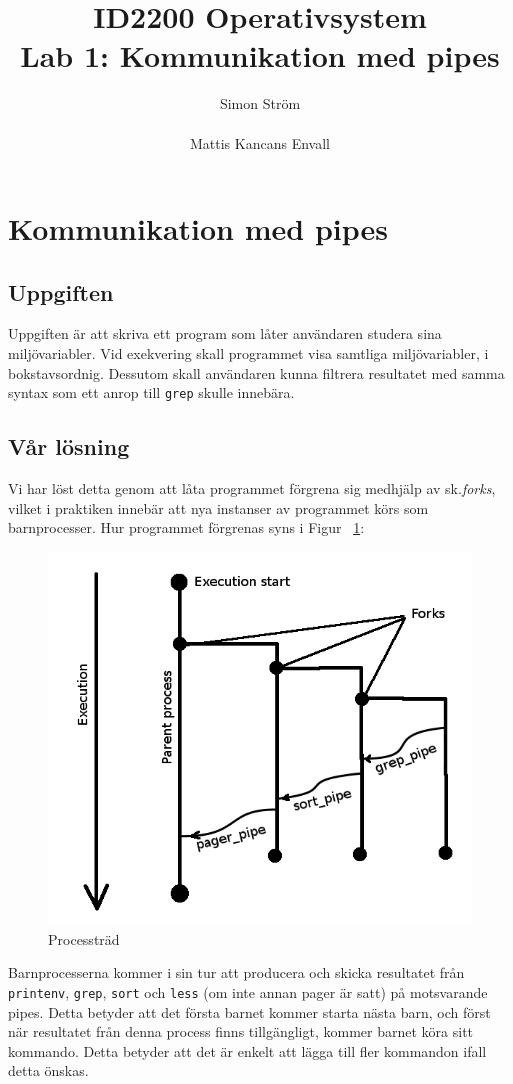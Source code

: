 \documentclass[a4paper,11pt]{article}
\author{Simon Ström\\\email{simstr@kth.se}\\Mattis Kancans Envall\\\email{mattiske@kth.se}}
\title{ID2200 Operativsystem\\ Lab 1: Kommunikation med pipes }
\begin{document}
    

    \section{Kommunikation med pipes}
        \subsection{Uppgiften}
        Uppgiften är att skriva ett program som låter användaren studera sina miljövariabler. Vid exekvering skall programmet visa samtliga miljövariabler, i bokstavsordnig. Dessutom skall användaren kunna filtrera resultatet med samma syntax som ett anrop till {\tt grep} skulle innebära.
        \subsection{Vår lösning}
        Vi har löst detta genom att låta programmet förgrena sig medhjälp av sk.{\it forks}, vilket i praktiken innebär att nya instanser av programmet körs som barnprocesser. Hur programmet förgrenas syns i Figur ~\ref{fig:processtree}:
\begin{figure}[h!]
  \centering
  \includegraphics[scale=0.3]{imgs/fig1.png}
  \caption{Processträd}
  \label{fig:processtree}
\end{figure}

Barnprocesserna kommer i sin tur att producera och skicka resultatet från {\tt printenv}, {\tt grep}, {\tt sort} och {\tt less} (om inte annan pager är satt) på motsvarande pipes. Detta betyder att det första barnet kommer starta nästa barn, och först när resultatet från denna process finns tillgängligt, kommer barnet köra sitt kommando. Detta betyder att det är enkelt att lägga till fler kommandon ifall detta önskas.
\end{document}
